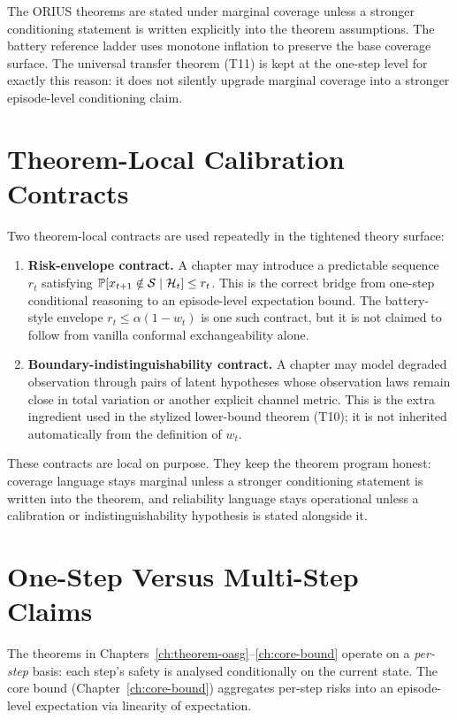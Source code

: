 The ORIUS theorems are stated under marginal coverage unless a stronger
conditioning statement is written explicitly into the theorem assumptions.
The battery reference ladder uses monotone inflation to preserve the base
coverage surface.  The universal transfer theorem (T11) is kept at the
one-step level for exactly this reason: it does not silently upgrade
marginal coverage into a stronger episode-level conditioning claim.

\section{Theorem-Local Calibration Contracts}
\label{sec:theorem-local-calibration-contracts}

Two theorem-local contracts are used repeatedly in the tightened theory
surface:
\begin{enumerate}
  \item \textbf{Risk-envelope contract.}  A chapter may introduce a
    predictable sequence $r_t$ satisfying
    $\operatorname{\mathbb{P}}[x_{t+1}\notin\mathcal{S}\mid \mathcal{H}_t] \le r_t$.
    This is the correct bridge from one-step conditional reasoning to an
    episode-level expectation bound.  The battery-style envelope
    $r_t \le \alpha(1-w_t)$ is one such contract, but it is not claimed to
    follow from vanilla conformal exchangeability alone.
  \item \textbf{Boundary-indistinguishability contract.}  A chapter may
    model degraded observation through pairs of latent hypotheses whose
    observation laws remain close in total variation or another explicit
    channel metric.  This is the extra ingredient used in the stylized
    lower-bound theorem (T10); it is not inherited automatically from the
    definition of $w_t$.
\end{enumerate}

These contracts are local on purpose.  They keep the theorem program honest:
coverage language stays marginal unless a stronger conditioning statement is
written into the theorem, and reliability language stays operational unless a
calibration or indistinguishability hypothesis is stated alongside it.

\section{One-Step Versus Multi-Step Claims}

The theorems in Chapters~\ref{ch:theorem-oasg}--\ref{ch:core-bound}
operate on a \emph{per-step} basis: each step's safety is analysed
conditionally on the current state.  The core bound
(Chapter~\ref{ch:core-bound}) aggregates per-step risks into an
episode-level expectation via linearity of expectation.

